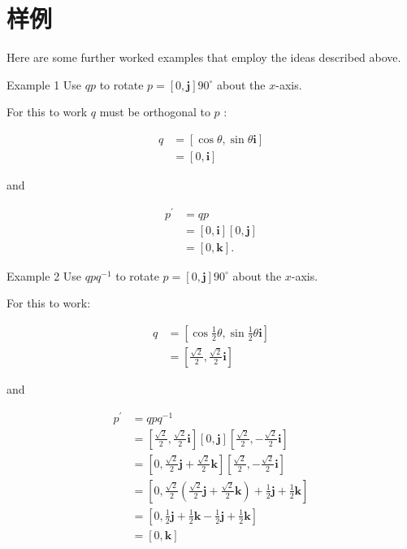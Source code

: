 \section{样例}
Here are some further worked examples that employ the ideas described above.

Example 1 Use $q p$ to rotate $p=[0, \mathbf{j}] 90^{\circ}$ about the $x$-axis.

For this to work $q$ must be orthogonal to $p$ :

$$
\begin{aligned}
q & =[\cos \theta, \sin \theta \mathbf{i}] \\
& =[0, \mathbf{i}]
\end{aligned}
$$

and

$$
\begin{aligned}
p^{\prime} & =q p \\
& =[0, \mathbf{i}][0, \mathbf{j}] \\
& =[0, \mathbf{k}] .
\end{aligned}
$$

Example 2 Use $q p q^{-1}$ to rotate $p=[0, \mathbf{j}] 90^{\circ}$ about the $x$-axis.

For this to work:

$$
\begin{aligned}
q & =\left[\cos \frac{1}{2} \theta, \sin \frac{1}{2} \theta \mathbf{i}\right] \\
& =\left[\frac{\sqrt{2}}{2}, \frac{\sqrt{2}}{2} \mathbf{i}\right]
\end{aligned}
$$

and

$$
\begin{aligned}
p^{\prime} & =q p q^{-1} \\
& =\left[\frac{\sqrt{2}}{2}, \frac{\sqrt{2}}{2} \mathbf{i}\right][0, \mathbf{j}]\left[\frac{\sqrt{2}}{2},-\frac{\sqrt{2}}{2} \mathbf{i}\right] \\
& =\left[0, \frac{\sqrt{2}}{2} \mathbf{j}+\frac{\sqrt{2}}{2} \mathbf{k}\right]\left[\frac{\sqrt{2}}{2},-\frac{\sqrt{2}}{2} \mathbf{i}\right] \\
& =\left[0, \frac{\sqrt{2}}{2}\left(\frac{\sqrt{2}}{2} \mathbf{j}+\frac{\sqrt{2}}{2} \mathbf{k}\right)+\frac{1}{2} \mathbf{j}+\frac{1}{2} \mathbf{k}\right] \\
& =\left[0, \frac{1}{2} \mathbf{j}+\frac{1}{2} \mathbf{k}-\frac{1}{2} \mathbf{j}+\frac{1}{2} \mathbf{k}\right] \\
& =[0, \mathbf{k}]
\end{aligned}
$$

